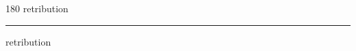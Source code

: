 
\begin{frame}
\begin{center}
\begin{turn}{180}
{\fontsize{2.5cm}{1em}\selectfont retribution}
\end{turn}
\vspace{1em}\par  
\hrule
\vspace{1em}\par  
{\fontsize{2.5cm}{1em}\selectfont retribution}
\end{center}
\end{frame}
